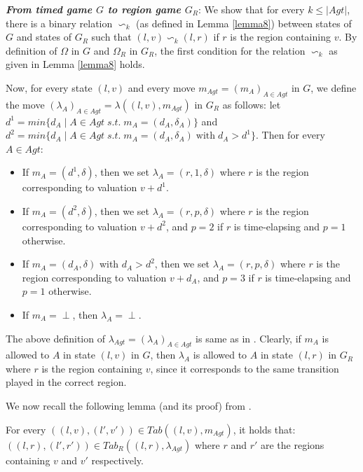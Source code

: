 \textbf{\textit{From timed game $G$ to region game $G_{R}$}}: We show that for every $k \leq \vert Agt \vert$, there is a binary relation $\backsim_{k}$ (as defined in Lemma \ref{lemma8}) between states of $G$ and states of $G_{R}$ such that $(l, v) \backsim_{k} (l, r)$ if $r$ is the region containing $v$. By definition of $\Omega$ in $G$ and $\Omega_{R}$ in $G_{R}$, the first condition for the relation $\backsim_{k}$ as given in Lemma \ref{lemma8} holds.

Now, for every state $(l, v)$ and every move $m_{Agt} = (m_{A})_{A\in Agt}$ in $G$, we define the move $(\lambda_{A})_{A\in Agt} = \lambda((l, v), m_{Agt})$ in $G_{R}$ as follows: let $d^{1} = min\lbrace d_{A} \; \vert \; A \in Agt \; s.t. \; m_{A} = (d_{A}, \delta_{A}) \rbrace$ and $d^{2} = min\lbrace d_{A} \; \vert \; A \in Agt \; s.t. \; m_{A} = (d_{A}, \delta_{A}) \; \text{with} \; d_{A} > d^{1} \rbrace$. Then for every $A \in Agt$:
\begin{itemize}
\item If $m_{A} = (d^{1}, \delta)$, then we set $\lambda_{A} = (r, 1, \delta)$ where $r$ is the region corresponding to valuation $v + d^{1}$.
\item If $m_{A} = (d^{2}, \delta)$, then we set $\lambda_{A} = (r, p, \delta)$ where $r$ is the region corresponding to valuation $v + d^{2}$, and $p = 2$ if $r$ is time-elapsing and $p = 1$ otherwise.
\item If $m_{A} = (d_{A}, \delta)$ with $d_{A} > d^{2}$, then we set $\lambda_{A} = (r, p, \delta)$ where $r$ is the region corresponding to valuation $v + d_{A}$, and $p = 3$ if $r$ is time-elapsing and $p = 1$ otherwise.
\item If $m_{A} = \perp$, then $\lambda_{A} = \perp$.
\end{itemize}

The above definition of $\lambda_{Agt} = (\lambda_{A})_{A\in Agt}$ is same as in \cite{BBM-concur10,BBM-report}. Clearly, if $m_{A}$ is allowed to $A$ in state $(l, v)$ in $G$, then $\lambda_{A}$ is allowed to $A$ in state $(l, r)$ in $G_{R}$ where $r$ is the region containing $v$, since it corresponds to the same transition played in the correct region.

We now recall the following lemma (and its proof) from \cite{BBM-report}.

\begin{lemma}
\label{lemma9}
For every $((l, v), (l', v')) \in Tab((l, v), m_{Agt})$, it holds that:\\
$((l, r), (l', r')) \in Tab_{R}((l, r), \lambda_{Agt})$ where $r$ and $r'$ are the regions containing $v$ and $v'$ respectively.
\end{lemma}


